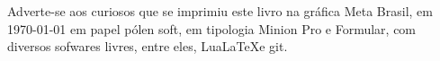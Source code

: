 \pagebreak

\ifodd\thepage\blankpage\fi

\parindent=0pt
\footnotesize\thispagestyle{empty}










\mbox{}\vfill
\begin{center}
		\begin{minipage}{.7\textwidth}\tiny\noindent{}
		\centering\tiny
		Adverte-se aos curiosos que se imprimiu 
		este livro na gráfica Meta Brasil, 
		em \today{} em papel pólen soft, em tipologia Minion Pro e Formular, 
		com diversos sofwares livres, 
		entre eles, Lua\LaTeX e git.\\ 
		\medskip\\\
		\end{minipage}
\end{center}